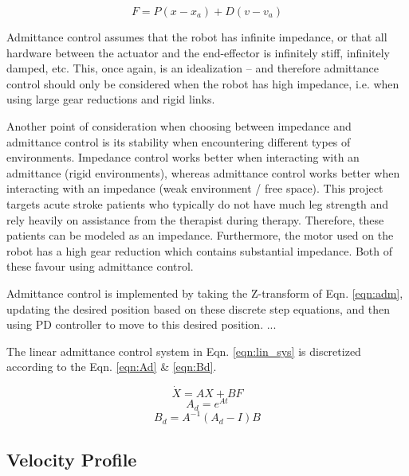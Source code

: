 \documentclass[12pt]{report}
\begin{document}
	\begin{equation} \label{eqn:PD}
	F = P(x - x_a) + D(v - v_a)
	\end{equation}

	Admittance control assumes that the robot has infinite impedance, or that all hardware between the actuator and the end-effector is infinitely stiff, infinitely damped, etc. This, once again, is an idealization -- and therefore admittance control should only be considered when the robot has high impedance, i.e. when using large gear reductions and rigid links. 
	
	Another point of consideration when choosing between impedance and admittance control is its stability when encountering different types of environments. Impedance control works better when interacting with an admittance (rigid environments), whereas admittance control works better when interacting with an impedance (weak environment / free space). This project targets acute stroke patients who typically do not have much leg strength and rely heavily on assistance from the therapist during therapy. Therefore, these patients can be modeled as an impedance. Furthermore, the motor used on the robot has a high gear reduction which contains substantial impedance. Both of these favour using admittance control. 
	
	Admittance control is implemented by taking the Z-transform of Eqn. \ref{eqn:adm}, updating the desired position based on these discrete step equations, and then using PD controller to move to this desired position. ...
	
	The linear admittance control system in Eqn. \ref{eqn:lin_sys} is discretized according to the Eqn. \ref{eqn:Ad} \& \ref{eqn:Bd}.
	
	\begin{equation} \label{eqn:lin_sys} 
	\dot{X} = AX + BF
	\end{equation}
	\begin{equation} \label{eqn:Ad} 
	A_d = e^{At} 
	\end{equation}
	\begin{equation} \label{eqn:Bd} 
	B_d = A^{-1}(A_d - I)B
	\end{equation}
	
	\subsection{Velocity Profile}	
	
\end{document}
